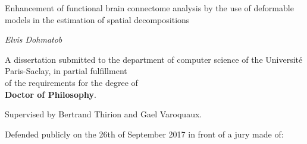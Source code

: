 \documentclass[nobib, a4paper, notoc, twoside, justified, openany]{tufte-book}
\begin{document}
\begin{titlepage}
\begin{fullwidth}
\begin{center}

\vspace{2pc}
{ \Huge
{\color{msblue} {Enhancement of functional brain connectome analysis by the use of deformable
models in the estimation of spatial decompositions}} \\[0.5cm]
}




\vspace{3pc}
{\Huge \it Elvis Dohmatob} \\

\vspace{3pc}



{\LARGE A dissertation submitted to the department of computer science of the Universit\'e Paris-Saclay, in partial fulfillment
  \\of the requirements for the degree of \\  \vspace{10pt} 
  \textbf{Doctor of Philosophy}.}\\
\vspace{1pc}

{\LARGE Supervised by {Bertrand Thirion} and {Gael Varoquaux}.}


\vspace{2pc}
{\LARGE Defended publicly on the 26th of September 2017 in front of a jury made of:}
\vspace{2pc}



\end{center}
\end{fullwidth}
\end{titlepage}
\end{document}
